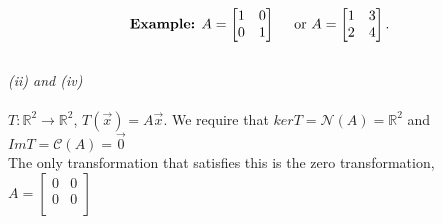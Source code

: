 \documentclass{report}
\begin{document}
       \[
       \text{\textbf{Example:} } A = \begin{bmatrix}
       1 & 0\\
       0 & 1\\
       \end{bmatrix} \quad \text{ or } A =  \begin{bmatrix}
       1 & 3\\
       2 & 4\\
       \end{bmatrix}
       .\] 
       \\
       \textit{ (ii) and (iv) }\\
       \\
       $ T: \mathbb{R} ^2 \to \mathbb{R} ^2$, $ T \left(  \vec{ x}  \right) = A \vec{ x} $. We require that $ ker T =  \mathcal{N} \left( A \right) = \mathbb{R} ^2 $ and $ Im T = \mathcal{C} \left( A \right) = { \vec{ 0} }$\\
       The only transformation that satisfies this is the zero transformation, $ A = \begin{bmatrix}
       0 & 0\\
       0& 0\\
       \end{bmatrix}$
\end{document}
